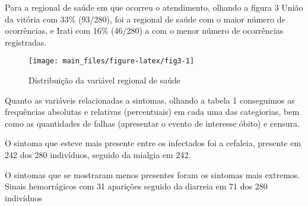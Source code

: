 \documentclass[
	12pt,				%
	openright,			%
	oneside,			%
	a4paper,			%
	brazil				%
	]{abntex2}
\begin{document}
Para a regional de saúde em que ocorreu o atendimento, olhando a figura 3 União da vitória com 33\% (93/280), foi a regional de saúde com o maior número de ocorrências, e Irati com 16\% (46/280) a com o menor número de ocorrências registradas.

\begin{figure}[!h]

{\centering \texttt{[image: main\_files/figure-latex/fig3-1]} 

}

\caption{Distribuição da variável regional de saúde}\label{fig:fig3}
\end{figure}

Quanto as variáveis relacionadas a sintomas, olhando a tabela 1 conseguimos as frequências absolutas e relativas (percentuais) em cada uma das categiorias, bem como as quantidades de falhas (apresentar o evento de interesse óbito) e censura.

O sintoma que esteve mais presente entre os infectados foi a cefaleia, presente em 242 dos 280 indivíduos, seguido da mialgia em 242.

O sintomas que se mostraram menos presentes foram os sintomas mais extremos. Sinais hemorrágicos com 31 aparições seguido da diarreia em 71 dos 280 indivíduos
\end{document}
